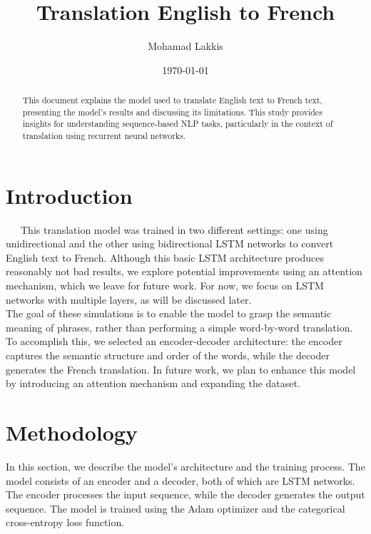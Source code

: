 \documentclass{article}
\title{Translation English to French}
\author{Mohamad Lakkis}
\date{\today}
\begin{document}
\maketitle

\begin{abstract}
  This document explains the model used to translate English text to French text, presenting the model's results and discussing its limitations. This study provides insights for understanding sequence-based NLP tasks, particularly in the context of translation using recurrent neural networks.
\end{abstract}
  
\section{Introduction}
\ \ \ This translation model was trained in two different settings: one using unidirectional and the other using bidirectional LSTM networks to convert English text to French. Although this basic LSTM architecture produces reasonably not bad results, we explore potential improvements using an attention mechanism, which we leave for future work. For now, we focus on LSTM networks with multiple layers, as will be discussed later.\\

The goal of these simulations is to enable the model to grasp the semantic meaning of phrases, rather than performing a simple word-by-word translation. To accomplish this, we selected an encoder-decoder architecture: the encoder captures the semantic structure and order of the words, while the decoder generates the French translation. In future work, we plan to enhance this model by introducing an attention mechanism and expanding the dataset.\\

\section{Methodology}
In this section, we describe the model's architecture and the training process. The model consists of an encoder and a decoder, both of which are LSTM networks. The encoder processes the input sequence, while the decoder generates the output sequence. The model is trained using the Adam optimizer and the categorical cross-entropy loss function.\\
\end{document}
